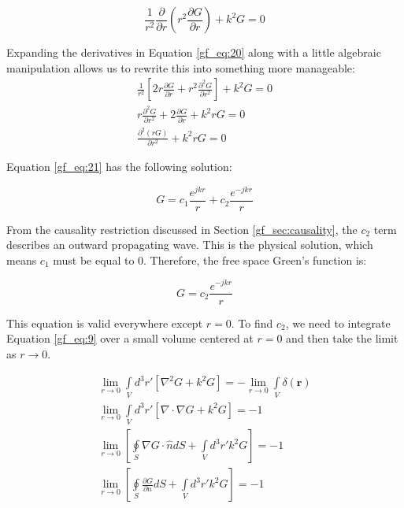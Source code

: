 \begin{equation}
\frac{1}{r^2}\frac{\partial}{\partial r}\left(r^2\frac{\partial G}{\partial r}\right)+ k^2G = 0
\label{gf_eq:20}
\end{equation}
\renewcommand{\baselinestretch}{2} \small\normalsize

Expanding the derivatives in Equation \ref{gf_eq:20} along with a little algebraic manipulation allows us to rewrite this into something more manageable:
\begin{equation}
\begin{gathered}
\frac{1}{r^2}\left[2r\frac{\partial G}{\partial r}+ r^2\frac{\partial^2 G}{\partial r^2}  \right] + k^2G = 0 \\
r\frac{\partial^2 G}{\partial r^2} + 2\frac{\partial G}{\partial r}+ k^2rG = 0 \\
\frac{\partial^2 \left(rG\right)}{\partial r^2} + k^2rG = 0
\end{gathered}
\label{gf_eq:21}
\end{equation}
\renewcommand{\baselinestretch}{2} \small\normalsize

Equation \ref{gf_eq:21} has the following  solution:

\begin{equation}
G = c_1\frac{e^{jkr}}{r} + c_2\frac{e^{-jkr}}{r}
\label{gf_eq:22}
\end{equation}
\renewcommand{\baselinestretch}{2} \small\normalsize

From the causality restriction discussed in Section \ref{gf_sec:causality}, the $c_2$ term describes an outward propagating wave. This is the physical solution, which means $c_1$ must be equal to $0$. Therefore, the free space Green's function is:

\begin{equation}
G = c_2\frac{e^{-jkr}}{r}
\label{gf_eq:23}
\end{equation}
\renewcommand{\baselinestretch}{2} \small\normalsize

This equation is valid everywhere except $r=0$. To find $c_2$, we need to integrate Equation \ref{gf_eq:9} over a small volume centered at $r=0$ and then take the limit as $r\rightarrow0$.

\begin{equation}
\begin{gathered}
\lim_{r\to0}\int\limits_{V}d^3r'\left[\nabla^2G+ k^2G\right] = -\lim_{r\to0}\int\limits_{V}\delta\left(\mathbf{r}\right) \\
\lim_{r\to0}\int\limits_{V}d^3r'\left[\nabla \cdot\nabla G+ k^2G\right] = -1 \\
\lim_{r\to0}\left[\oint\limits_{S}\nabla G \cdot \hat{n} dS + \int\limits_{V}d^3r' k^2G\right] = -1 \\
\lim_{r\to0}\left[\oint\limits_{S}\frac{\partial G}{\partial n} dS + \int\limits_{V}d^3r' k^2G\right] = -1
\end{gathered}
\label{gf_eq:24}
\end{equation}
\renewcommand{\baselinestretch}{2} \small\normalsize

